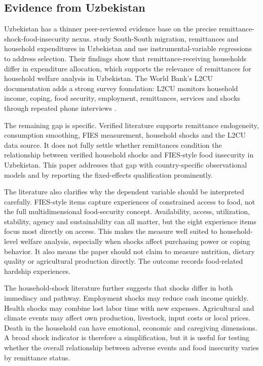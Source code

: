 \documentclass[11pt]{article}
\begin{document}
\subsection{Evidence from Uzbekistan}

Uzbekistan has a thinner peer-reviewed evidence base on the precise remittance-shock-food-insecurity nexus. \textcite{Kakhkharov2021} study South-South migration, remittances and household expenditures in Uzbekistan and use instrumental-variable regressions to address selection. Their findings show that remittance-receiving households differ in expenditure allocation, which supports the relevance of remittances for household welfare analysis in Uzbekistan. The World Bank's L2CU documentation adds a strong survey foundation: L2CU monitors household income, coping, food security, employment, remittances, services and shocks through repeated phone interviews \parencite{WorldBank2025a,WorldBank2025b,Uochi2025}.

The remaining gap is specific. Verified literature supports remittance endogeneity, consumption smoothing, FIES measurement, household shocks and the L2CU data source. It does not fully settle whether remittances condition the relationship between verified household shocks and FIES-style food insecurity in Uzbekistan. This paper addresses that gap with country-specific observational models and by reporting the fixed-effects qualification prominently.

The literature also clarifies why the dependent variable should be interpreted carefully. FIES-style items capture experiences of constrained access to food, not the full multidimensional food-security concept. Availability, access, utilization, stability, agency and sustainability can all matter, but the eight experience items focus most directly on access. This makes the measure well suited to household-level welfare analysis, especially when shocks affect purchasing power or coping behavior. It also means the paper should not claim to measure nutrition, dietary quality or agricultural production directly. The outcome records food-related hardship experiences.

The household-shock literature further suggests that shocks differ in both immediacy and pathway. Employment shocks may reduce cash income quickly. Health shocks may combine lost labor time with new expenses. Agricultural and climate events may affect own production, livestock, input costs or local prices. Death in the household can have emotional, economic and caregiving dimensions. A broad shock indicator is therefore a simplification, but it is useful for testing whether the overall relationship between adverse events and food insecurity varies by remittance status.
\end{document}
